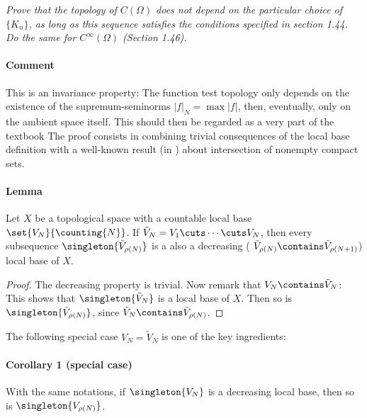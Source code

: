 \textit{
Prove that the topology of $C(\Omega)$ does not depend on the particular 
choice of $\{K_{n}\}$, as long as this sequence satisfies the conditions 
specified in section 1.44. Do the same for $C^\infty(\Omega)$ (Section 1.46).}
%
\paragraph{Comment}This is an invariance property: 
The function test topology only depends on the existence of the 
supremum-seminorms $|f|_N = \max{|f|}$, then, eventually, 
only on the ambient space itself. 
This should then be regarded as a very part of the textbook \cite{FA}
%
The proof consists in combining trivial consequences of the local base 
definition with a well-known result (\eg [2.6] in \cite{BigRudin}) 
about intersection of nonempty compact sets. 

\paragraph{Lemma} Let $X$ be a topological space with a countable local base 
$\set{V_N}{\counting{N}}$. 
If 
%
  $\tilde{V}_{N} = V_1 \cuts \cdots \cuts V_N$, 
%
then every subsequence 
% 
  $\singleton{\tilde{V}_{\rho(N)}}$ 
%
is a also a {decreasing} (\ie 
%
  $\tilde{V}_{\rho(N)} \contains \tilde{V}_{\rho(N+1)}$)
%
local base of $X$.
%
\begin{proof}
The decreasing property is trivial. Now remark that 
%
  $V_N \contains \tilde{V}_{N}$:
%
This shows that 
%
  $\singleton{\tilde{V}_{N}}$ 
% 
is a local base of $X$. Then so is 
%
  $\singleton{\tilde{V}_{\rho(N)}}$,
% 
since $\tilde{V}_{N} \contains \tilde{V}_{\rho(N)}$.
\end{proof}
%
The following special case 
%
  $V_{N} = \tilde{V}_{N}$ 
% 
is one of the key ingredients:
\paragraph{Corollary 1 (special case)}
With the same notations, if $\singleton{V_{N}}$ is a decreasing local base, 
then so is $\singleton{V_{\rho(N)}}$.
%
